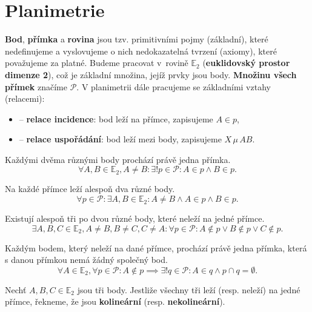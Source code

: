 \section{Planimetrie}

\begin{pozn}
  \textbf{Bod}, \textbf{přímka} a \textbf{rovina} jsou tzv. primitivními pojmy (základní), které nedefinujeme a vyslovujeme o nich nedokazatelná tvrzení (axiomy),
  které považujeme za platné. Budeme pracovat v rovině $\mathbb E_2$ (\textbf{euklidovský prostor dimenze 2}),
  což je základní množina, jejíž prvky jsou body. \textbf{Množinu všech přímek} značíme $\mathscr P$.
  V planimetrii dále pracujeme se základními vztahy (relacemi):
  \begin{itemize}
    \item {} -- \textbf{relace incidence}: bod leží na přímce, zapisujeme $A \in p$,
    \item {} -- \textbf{relace uspořádání}: bod leží mezi body, zapisujeme $X \, \mu \, AB$.
  \end{itemize}
\end{pozn}

\begin{axiom}
  Každými dvěma různými body prochází právě jedna přímka.
  $$\forall A, B \in \mathbb E_2, A\neq B: \exists! p \in \mathscr P: A \in p \land B \in p.$$
\end{axiom}

\begin{axiom}
  Na každé přímce leží alespoň dva různé body.
  $$\forall p \in \mathscr P:\exists A,B \in \mathbb E_2: A\neq B \land A \in p \land B \in p.$$
\end{axiom}

\begin{axiom}
  Existují alespoň tři po dvou různé body, které neleží na jedné přímce.
  $$\exists A,B,C \in \mathbb E_2, A \neq B, B\neq C, C\neq A: \forall p \in \mathscr P: A \notin p \lor B \notin p \lor C \notin p.$$
\end{axiom}

\begin{axiom}
  Každým bodem, který neleží na dané přímce, prochází právě jedna přímka, která s danou přímkou nemá žádný společný bod.
  $$\forall A \in \mathbb E_2, \forall p \in \mathscr P: A \notin p \implies \exists! q \in \mathscr P: A \in q \land p \cap q = \emptyset.$$
\end{axiom}

\begin{definition}
  Nechť $A,B,C\in \mathbb E_2$ jsou tři body. Jestliže všechny tři leží (resp. neleží) na jedné přímce, řekneme, že jsou \textbf{kolineární} (resp. \textbf{nekolineární}).
\end{definition}

